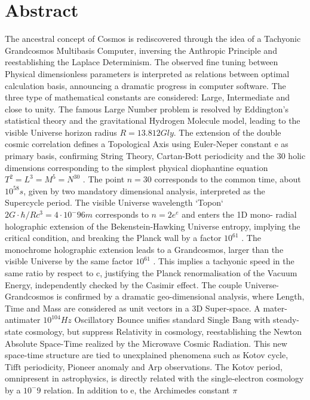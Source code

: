 
\chapter*{Abstract}
\vspace{-40pt}
The ancestral concept of Cosmos is rediscovered through the idea of a Tachyonic
Grandcosmos Multibasis Computer, inversing the Anthropic Principle and reestablishing
the Laplace Determinism. The observed fine tuning between Physical dimensionless
parameters is interpreted as relations between optimal calculation basis, announcing a
dramatic progress in computer software. The three type of mathematical constants are
considered: Large, Intermediate and close to unity. The famous Large Number problem is
resolved by Eddington's statistical theory and the gravitational Hydrogen Molecule model,
leading to the visible Universe horizon radius $R = 13.812 Gly$. The extension of
the double cosmic correlation defines a Topological Axis using Euler-Neper constant e as
primary basis, confirming String Theory, Cartan-Bott periodicity and the 30 holic
dimensions corresponding to the simplest physical diophantine equation $T^2 = L^3 = M^5 =
N^30$ . The point $n = 30$ corresponds to the common time, about $10^58 s$, given by two
mandatory dimensional analysis, interpreted as the Supercycle period. The visible Universe
wavelength `Topon` $2G \cdot \hbar / Rc^3 = 4 \cdot 10^-96 m$ corresponds to $n = 2e^e$ and enters the 1D mono-
radial holographic extension of the Bekenstein-Hawking Universe entropy, implying the
critical condition, and breaking the Planck wall by a factor $10^61$ . The monochrome
holographic extension leads to a Grandcosmos, larger than the visible Universe by the
same factor $10^61$ . This implies a tachyonic speed in the same ratio by respect to c, justifying
the Planck renormalisation of the Vacuum Energy, independently checked by the Casimir
effect. The couple Universe-Grandcosmos is confirmed by a dramatic geo-dimensional
analysis, where Length, Time and Mass are considered as unit vectors in a 3D Super-space.
A mater-antimater $10^104 Hz$ Oscillatory Bounce unifies standard Single Bang with steady-
state cosmology, but suppress Relativity in cosmology, reestablishing the Newton Absolute
Space-Time realized by the Microwave Cosmic Radiation. This new space-time structure are
tied to unexplained phenomena such as Kotov cycle, Tifft periodicity, Pioneer anomaly and
Arp observations. The Kotov period, omnipresent in astrophysics, is directly related with the
single-electron cosmology by a $10^-9$ relation. In addition to e, the Archimedes constant $\pi$
